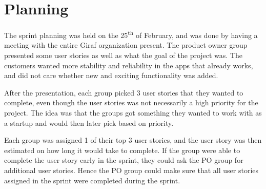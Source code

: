 \section{Planning}
The sprint planning was held on the 25\textsuperscript{th} of February, and was done by having a meeting with the entire Giraf organization present. 
The product owner group presented some user stories as well as what the goal of the project was. 
The customers wanted more stability and reliability in the apps that already works, and did not care whether new and exciting functionality was added. 

After the presentation, each group picked 3 user stories that they wanted to complete, even though the user stories was not necessarily a high priority for the project. 
The idea was that the groups got something they wanted to work with as a startup and would then later pick based on priority.

Each group was assigned 1 of their top 3 user stories, and the user story was then estimated on how long it would take to complete.
If the group were able to complete the user story early in the sprint, they could ask the PO group for additional user stories.
Hence the PO group could make sure that all user stories assigned in the sprint were completed during the sprint.

 
